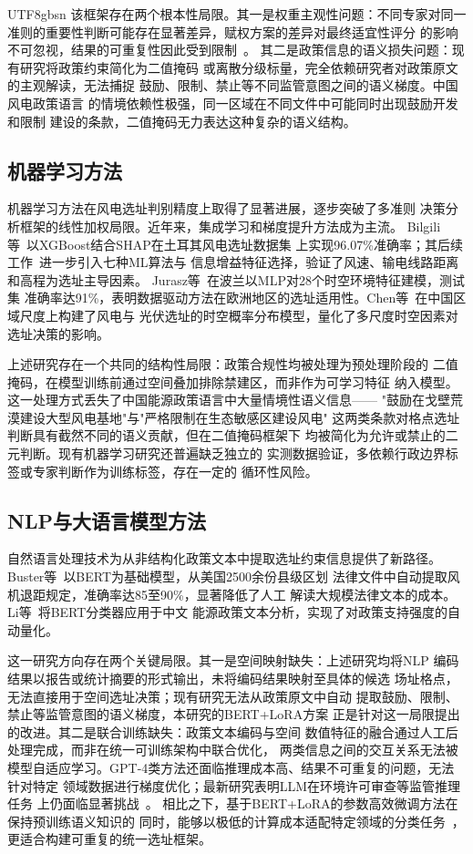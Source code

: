 \documentclass[12pt, a4paper]{article}
\begin{document}
\begin{CJK}{UTF8}{gbsn}
该框架存在两个根本性局限。其一是权重主观性问题：不同专家对同一
准则的重要性判断可能存在显著差异，赋权方案的差异对最终适宜性评分
的影响不可忽视，结果的可重复性因此受到限制~\cite{wu2022,xu2020}。
其二是政策信息的语义损失问题：现有研究将政策约束简化为二值掩码
或离散分级标量，完全依赖研究者对政策原文的主观解读，无法捕捉
鼓励、限制、禁止等不同监管意图之间的语义梯度。中国风电政策语言
的情境依赖性极强，同一区域在不同文件中可能同时出现鼓励开发和限制
建设的条款，二值掩码无力表达这种复杂的语义结构。

\subsection{机器学习方法}

机器学习方法在风电选址判别精度上取得了显著进展，逐步突破了多准则
决策分析框架的线性加权局限。近年来，集成学习和梯度提升方法成为主流。
Bilgili等~\cite{bilgili2024}以XGBoost结合SHAP在土耳其风电选址数据集
上实现96.07\%准确率；其后续工作~\cite{bilgili2024xai}进一步引入七种ML算法与
信息增益特征选择，验证了风速、输电线路距离和高程为选址主导因素。
Jurasz等~\cite{jurasz2025}在波兰以MLP对28个时空环境特征建模，测试集
准确率达91\%，表明数据驱动方法在欧洲地区的选址适用性。Chen等~\cite{chen2026}在中国区域尺度上构建了风电与
光伏选址的时空概率分布模型，量化了多尺度时空因素对选址决策的影响。

上述研究存在一个共同的结构性局限：政策合规性均被处理为预处理阶段的
二值掩码，在模型训练前通过空间叠加排除禁建区，而非作为可学习特征
纳入模型。这一处理方式丢失了中国能源政策语言中大量情境性语义信息——
"鼓励在戈壁荒漠建设大型风电基地"与"严格限制在生态敏感区建设风电"
这两类条款对格点选址判断具有截然不同的语义贡献，但在二值掩码框架下
均被简化为允许或禁止的二元判断。现有机器学习研究还普遍缺乏独立的
实测数据验证，多依赖行政边界标签或专家判断作为训练标签，存在一定的
循环性风险。

\subsection{NLP与大语言模型方法}

自然语言处理技术为从非结构化政策文本中提取选址约束信息提供了新路径。
Buster等~\cite{buster2024}以BERT为基础模型，从美国2500余份县级区划
法律文件中自动提取风机退距规定，准确率达85至90\%，显著降低了人工
解读大规模法律文本的成本。Li等~\cite{li2023}将BERT分类器应用于中文
能源政策文本分析，实现了对政策支持强度的自动量化。

这一研究方向存在两个关键局限。其一是空间映射缺失：上述研究均将NLP
编码结果以报告或统计摘要的形式输出，未将编码结果映射至具体的候选
场址格点，无法直接用于空间选址决策；现有研究无法从政策原文中自动
提取鼓励、限制、禁止等监管意图的语义梯度，本研究的BERT+LoRA方案
正是针对这一局限提出的改进。其二是联合训练缺失：政策文本编码与空间
数值特征的融合通过人工后处理完成，而非在统一可训练架构中联合优化，
两类信息之间的交互关系无法被模型自适应学习。GPT-4类方法还面临推理成本高、结果不可重复的问题，无法针对特定
领域数据进行梯度优化；最新研究表明LLM在环境许可审查等监管推理任务
上仍面临显著挑战~\cite{nepa2025}。
相比之下，基于BERT+LoRA的参数高效微调方法在保持预训练语义知识的
同时，能够以极低的计算成本适配特定领域的分类任务~\cite{hu2022}，
更适合构建可重复的统一选址框架。


\end{CJK}
\end{document}
